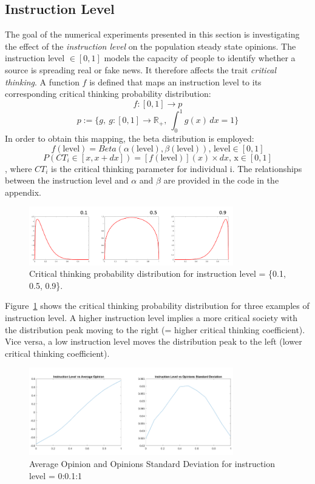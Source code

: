 \subsection{Instruction Level}
The goal of the numerical experiments presented in this section is investigating the effect of the \emph{instruction level} on the population steady state opinions. The instruction level $\in [0,1]$ models the capacity of people to identify whether a source is spreading real or fake news. It therefore affects the trait \emph{critical thinking}. A function $f$ is defined that maps an instruction level to its corresponding critical thinking probability distribution:
$$
f: [0,1] \to p 
$$
$$
p:= \{g,\ g: [0,1] \to \mathbb{R}_+,\ \int_{0}^{1} g(x) \,dx = 1\}
$$
In order to obtain this mapping, the beta distribution is employed: 
$$
f(\text{level}) = Beta(\alpha(\text{level}), \beta(\text{level}))\text{, level} \in [0,1]
$$
$$
P(CT_i\in[x,x+dx]) = [f(\text{level})](x)\times dx\text{, x}\in [0,1]
$$
, where $CT_i$ is the critical thinking parameter for individual i. The relationships between the instruction level and $\alpha$ and $\beta$ are provided in the code in the appendix. 
\begin{figure}[!t]
	\centering
	\includegraphics[width=3.5in]{Figures/instruction_level_dist.png}
	\caption{Critical thinking probability distribution for instruction level = \{0.1, 0.5, 0.9\}.}
	\label{pics:critdistribution}
\end{figure}
Figure~\ref{pics:critdistribution} shows the critical thinking probability distribution for three examples of instruction level. A higher instruction level implies a more critical society with the distribution peak moving to the right (= higher critical thinking coefficient). Vice versa, a low instruction level moves the distribution peak to the left (lower critical thinking coefficient). \newline
\begin{figure}[!t]
	\centering
	\includegraphics[width=3.5in]{Figures/instruction_results.png}
	\caption{Average Opinion and Opinions Standard Deviation for instruction level = 0:0.1:1}
	\label{pics:critstatistics}
\end{figure}
